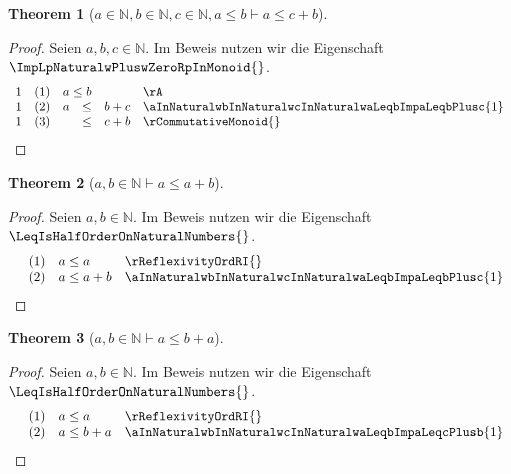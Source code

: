 \documentclass{book}
\theoremstyle{plain}
\newtheorem{theorem}{Theorem}
\theoremstyle{remark}
\theoremstyle{definition}
\begin{document}
\label{aInNaturalwbInNaturalwcInNaturalwaLeqbImpaLeqcPlusb}
\begin{theorem}[\(a\in\mathbb{N},b\in\mathbb{N},c\in\mathbb{N}, a\leq b\vdash a\leq c+b\)]
\end{theorem}
\begin{proof}
Seien \(a, b, c \in \mathbb{N}\). Im Beweis nutzen wir die Eigenschaft \(\ImpLpNaturalwPluswZeroRpInMonoid{}\).
        \[
	\begin{array}{llclll}
            1     &  (1) & \multicolumn{3}{l}{a\leq b} & \rA \\
            1     &  (2) & a&\leq& b+c & \aInNaturalwbInNaturalwcInNaturalwaLeqbImpaLeqbPlusc{1} \\
            1     &  (3) &  &\leq& c+b & \rCommutativeMonoid{} \\
        \end{array}
	\]
\end{proof}


\label{awbInNaturalImpaLeqaPlusb}
\begin{theorem}[\(a,b\in\mathbb{N}\vdash a\leq a+b\)]
\end{theorem}
\begin{proof}
Seien \(a, b \in \mathbb{N}\). Im Beweis nutzen wir die Eigenschaft \(\LeqIsHalfOrderOnNaturalNumbers{}\).
        \[
	\begin{array}{llll}
                  &  (1) & a\leq a & \rReflexivityOrdRI{} \\
                  &  (2) & a\leq a+b & \aInNaturalwbInNaturalwcInNaturalwaLeqbImpaLeqbPlusc{1} \\
        \end{array}
	\]
\end{proof}

\label{awbInNaturalImpaLeqbPlusa}
\begin{theorem}[\(a,b\in\mathbb{N}\vdash a\leq b+a\)]
\end{theorem}
\begin{proof}
Seien \(a, b \in \mathbb{N}\). Im Beweis nutzen wir die Eigenschaft \(\LeqIsHalfOrderOnNaturalNumbers{}\).
        \[
	\begin{array}{llll}
                  &  (1) & a\leq a & \rReflexivityOrdRI{} \\
                  &  (2) & a\leq b+a & \aInNaturalwbInNaturalwcInNaturalwaLeqbImpaLeqcPlusb{1} \\
        \end{array}
	\]
\end{proof}
\end{document}
